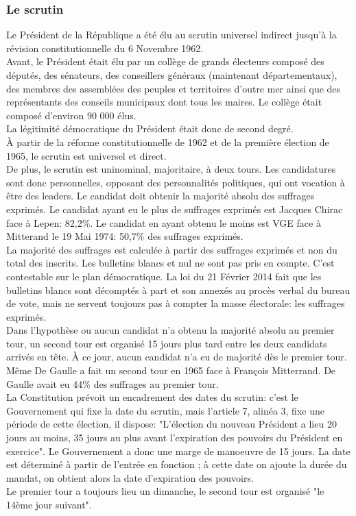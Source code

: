 \documentclass[12pt, a4paper, openany]{book}
\begin{document}
\subsubsection{Le scrutin}

Le Président de la République a été élu au scrutin universel indirect jusqu'à la révision constitutionnelle du 6 Novembre 1962. \\
Avant, le Président était élu par un collège de grands électeurs composé des députés, des sénateurs, des conseillers généraux (maintenant départementaux), des membres des assemblées des peuples et territoires d'outre mer ainsi que des représentants des conseils municipaux dont tous les maires. Le collège était composé d'environ 90 000 élus. \\
La légitimité démocratique du Président était donc de second degré. \\
À partir de la réforme constitutionnelle de 1962 et de la première élection de 1965, le scrutin est universel et direct. \\
De plus, le scrutin est uninominal, majoritaire, à deux tours. Les candidatures sont donc personnelles, opposant des personnalités politiques, qui ont vocation à être des leaders. Le candidat doit obtenir la majorité absolu des suffrages exprimés. Le candidat ayant eu le plus de suffrages exprimés est Jacques Chirac face à Lepen: 82,2\%. Le candidat en ayant obtenu le moins est VGE face à Mitterand le 19 Mai 1974: 50,7\% des suffrages exprimés. \\
La majorité des suffrages est calculée à partir des suffrages exprimés et non du total des inscrits. Les bulletins blancs et nul ne sont pas pris en compte. C'est contestable sur le plan démocratique. La loi du 21 Février 2014 fait que les bulletins blancs sont décomptés à part et son annexés au procès verbal du bureau de vote, mais ne servent toujours pas à compter la masse électorale: les suffrages exprimés. \\
Dans l'hypothèse ou aucun candidat n'a obtenu la majorité absolu au premier tour, un second tour est organisé 15 jours plus tard entre les deux candidats arrivés en tête. À ce jour, aucun candidat n'a eu de majorité dès le premier tour. Même De Gaulle a fait un second tour en 1965 face à François Mitterrand. De Gaulle avait eu 44\% des suffrages au premier tour. \\
La Constitution prévoit un encadrement des dates du scrutin: c'est le Gouvernement qui fixe la date du scrutin, mais l'article 7, alinéa 3, fixe une période de cette élection, il dispose: "L'élection du nouveau Président a lieu 20 jours au moins, 35 jours au plus avant l'expiration des pouvoirs du Président en exercice". Le Gouvernement a donc une marge de manoeuvre de 15 jours. La date est déterminé à partir de l'entrée en fonction ; à cette date on ajoute la durée du mandat, on obtient alors la date d'expiration des pouvoirs. \\ 
Le premier tour a toujours lieu un dimanche, le second tour est organisé "le 14ème jour suivant". 
\end{document}
